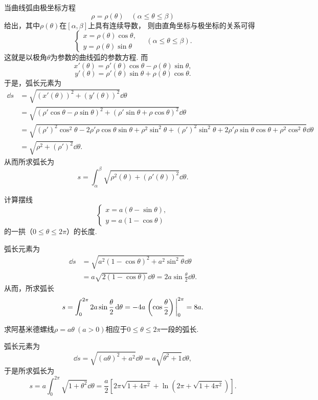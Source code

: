 当曲线弧由极坐标方程\[
	\rho=\rho(\theta)
	\quad(\alpha \leq \theta \leq \beta)
\]给出，其中\(\rho(\theta)\)在\([\alpha,\beta]\)上具有连续导数，
则由直角坐标与极坐标的关系可得\[
	\left\{ \begin{array}{c}
		x = \rho(\theta) \cos\theta, \\
		y = \rho(\theta) \sin\theta
	\end{array} \right.
	\quad(\alpha \leq \theta \leq \beta).
\]
这就是以极角\(\theta\)为参数的曲线弧的参数方程.
而\[
	x'(\theta) = \rho'(\theta) \cos\theta - \rho(\theta) \sin\theta,
\]\[
	y'(\theta) = \rho'(\theta) \sin\theta + \rho(\theta) \cos\theta.
\]
于是，弧长元素为\begin{align*}
	\dd{s}
	&= \sqrt{(x'(\theta))^2 + (y'(\theta))^2} \dd{\theta} \\
	&= \sqrt{(\rho' \cos\theta - \rho \sin\theta)^2
		+ (\rho' \sin\theta + \rho \cos\theta)^2} \dd{\theta} \\
	&= \sqrt{(\rho')^2\cos^2\theta-2\rho'\rho\cos\theta\sin\theta+\rho^2\sin^2\theta
		+ (\rho')^2\sin^2\theta+2\rho'\rho\sin\theta\cos\theta+\rho^2\cos^2\theta} \dd{\theta} \\
	&= \sqrt{\rho^2 + (\rho')^2} \dd{\theta}.
\end{align*}
从而所求弧长为\begin{equation}
	s = \int_\alpha^\beta \sqrt{\rho^2(\theta) + (\rho'(\theta))^2} \dd{\theta}.
\end{equation}

\begin{example}
计算摆线\[
	\left\{ \begin{array}{l}
		x = a (\theta - \sin\theta), \\
		y = a (1 - \cos\theta)
	\end{array} \right.
\]的一拱（\(0 \leq \theta \leq 2\pi\)）的长度.
\begin{solution}
弧长元素为\begin{align*}
	\dd{s} &= \sqrt{a^2 (1 - \cos\theta)^2 + a^2 \sin^2\theta} \dd{\theta} \\
	&= a \sqrt{2 (1 - \cos\theta)} \dd{\theta}
	= 2 a \sin\frac\theta2 \dd{\theta}.
\end{align*}
从而，所求弧长\[
	s = \int_0^{2\pi} 2a \sin\frac\theta2 \dd{\theta}
	= -4a \eval{\left(\cos\frac\theta2\right)}_0^{2\pi}
	= 8a.
\]
\end{solution}
\end{example}

\begin{example}
求阿基米德螺线\(\rho=a\theta\ (a>0)\)相应于\(0\leq\theta\leq2\pi\)一段的弧长.
\begin{solution}
弧长元素为\[
	\dd{s} = \sqrt{(a\theta)^2 + a^2} \dd{\theta}
	= a\sqrt{\theta^2+1} \dd{\theta},
\]
于是所求弧长为\[
	s = a \int_0^{2\pi} \sqrt{1+\theta^2} \dd{\theta}
	= \frac{a}{2} \left[
	2\pi\sqrt{1+4\pi^2} + \ln(2\pi+\sqrt{1+4\pi^2})
	\right].
\]
\end{solution}
\end{example}

